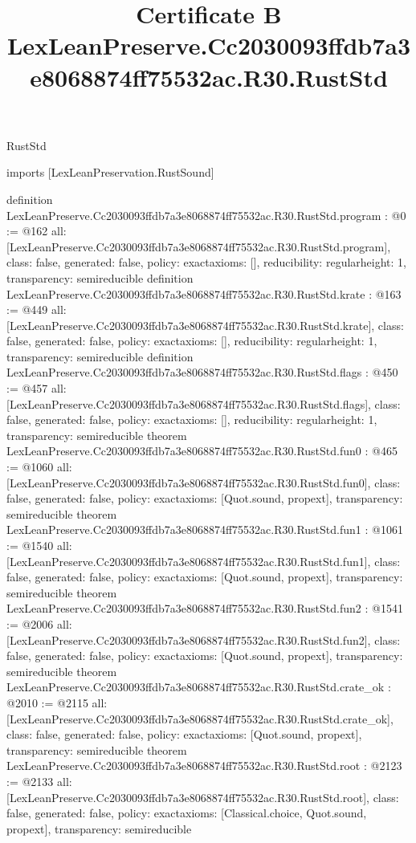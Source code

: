 \begin{lexlean}{RustStd}
\title{Certificate B LexLeanPreserve.Cc2030093ffdb7a3e8068874ff75532ac.R30.RustStd}
\begin{coremodule}
imports [LexLeanPreservation.RustSound]

definition LexLeanPreserve.Cc2030093ffdb7a3e8068874ff75532ac.R30.RustStd.program : @0 := @162 {
  all: [LexLeanPreserve.Cc2030093ffdb7a3e8068874ff75532ac.R30.RustStd.program],
  class: false,
  generated: false,
  policy: exact{axioms: []},
  reducibility: regular{height: 1},
  transparency: semireducible
}
definition LexLeanPreserve.Cc2030093ffdb7a3e8068874ff75532ac.R30.RustStd.krate : @163 := @449 {
  all: [LexLeanPreserve.Cc2030093ffdb7a3e8068874ff75532ac.R30.RustStd.krate],
  class: false,
  generated: false,
  policy: exact{axioms: []},
  reducibility: regular{height: 1},
  transparency: semireducible
}
definition LexLeanPreserve.Cc2030093ffdb7a3e8068874ff75532ac.R30.RustStd.flags : @450 := @457 {
  all: [LexLeanPreserve.Cc2030093ffdb7a3e8068874ff75532ac.R30.RustStd.flags],
  class: false,
  generated: false,
  policy: exact{axioms: []},
  reducibility: regular{height: 1},
  transparency: semireducible
}
theorem LexLeanPreserve.Cc2030093ffdb7a3e8068874ff75532ac.R30.RustStd.fun0 : @465 := @1060 {
  all: [LexLeanPreserve.Cc2030093ffdb7a3e8068874ff75532ac.R30.RustStd.fun0],
  class: false,
  generated: false,
  policy: exact{axioms: [Quot.sound, propext]},
  transparency: semireducible
}
theorem LexLeanPreserve.Cc2030093ffdb7a3e8068874ff75532ac.R30.RustStd.fun1 : @1061 := @1540 {
  all: [LexLeanPreserve.Cc2030093ffdb7a3e8068874ff75532ac.R30.RustStd.fun1],
  class: false,
  generated: false,
  policy: exact{axioms: [Quot.sound, propext]},
  transparency: semireducible
}
theorem LexLeanPreserve.Cc2030093ffdb7a3e8068874ff75532ac.R30.RustStd.fun2 : @1541 := @2006 {
  all: [LexLeanPreserve.Cc2030093ffdb7a3e8068874ff75532ac.R30.RustStd.fun2],
  class: false,
  generated: false,
  policy: exact{axioms: [Quot.sound, propext]},
  transparency: semireducible
}
theorem LexLeanPreserve.Cc2030093ffdb7a3e8068874ff75532ac.R30.RustStd.crate_ok : @2010 := @2115 {
  all: [LexLeanPreserve.Cc2030093ffdb7a3e8068874ff75532ac.R30.RustStd.crate_ok],
  class: false,
  generated: false,
  policy: exact{axioms: [Quot.sound, propext]},
  transparency: semireducible
}
theorem LexLeanPreserve.Cc2030093ffdb7a3e8068874ff75532ac.R30.RustStd.root : @2123 := @2133 {
  all: [LexLeanPreserve.Cc2030093ffdb7a3e8068874ff75532ac.R30.RustStd.root],
  class: false,
  generated: false,
  policy: exact{axioms: [Classical.choice, Quot.sound, propext]},
  transparency: semireducible
}


\end{coremodule}
\end{lexlean}
